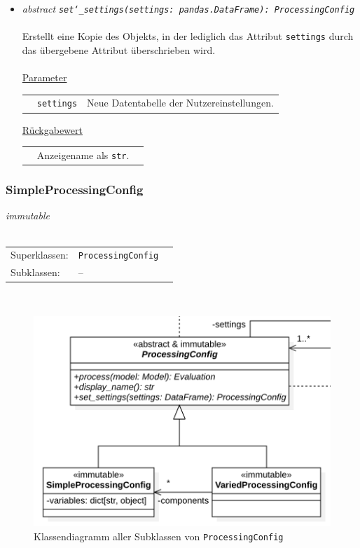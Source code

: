 \documentclass{article}
\begin{document}
\begin{itemize}
\item \textit{\flqq{}abstract\frqq} \texttt{\textit{set\char`_settings(settings: pandas.DataFrame): ProcessingConfig}}\\\\
Erstellt eine Kopie des Objekts, in der lediglich das Attribut \texttt{settings} durch das übergebene Attribut überschrieben wird.
\\\\
\underline{Parameter}\\
\begin{tabular}{lll}
 & \texttt{settings} & Neue Datentabelle der Nutzereinstellungen.\\
\end{tabular}

\underline{Rückgabewert}\\
\begin{tabular}{lll}
 & Anzeigename als \texttt{str}.\\
\end{tabular}
\end{itemize}

\newpage
\subsubsection*{\large{\textbf{SimpleProcessingConfig}\label{cls:SimpleProcessingConfig}}}
\textit{\flqq{}immutable\frqq}\normalsize\\\\
\begin{tabular}{lll}
 Superklassen: & \texttt{ProcessingConfig}\\
 Subklassen: & --
\end{tabular}\\
\begin{figure}[H]%
    \centering
    \includegraphics[width=13cm]{entwurf/Entwurf_dokument/img/cls/model/ProcessingConfigs.png}
    \caption{Klassendiagramm aller Subklassen von \texttt{ProcessingConfig}}
\end{figure}
\end{document}
